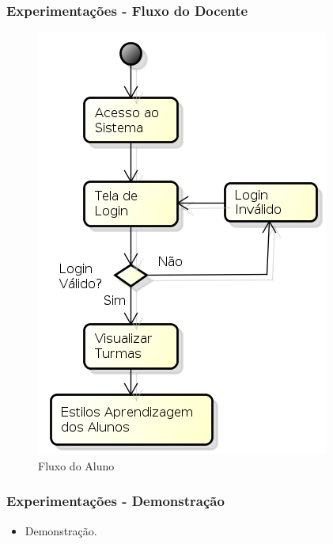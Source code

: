\documentclass{beamer}
\begin{document}
\begin{frame}
    \frametitle{Experimentações - Fluxo do Docente}
    \begin{figure}[h]
    	\centering \includegraphics[scale=0.3]{../images/fluxo-docente.png}
	\caption{Fluxo do Aluno}
	\label{arquiteturaFrank} 
    \end{figure}
\end{frame}

\begin{frame}
    \frametitle{Experimentações - Demonstração}
    \begin{itemize}
        \item Demonstração.
    \end{itemize}
\end{frame}

\end{document}
